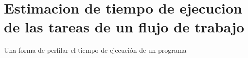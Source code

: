 \chapter{Estimacion de tiempo de ejecucion de las tareas de un flujo de trabajo}

Una forma de perfilar el tiempo de ejecución de un programa
